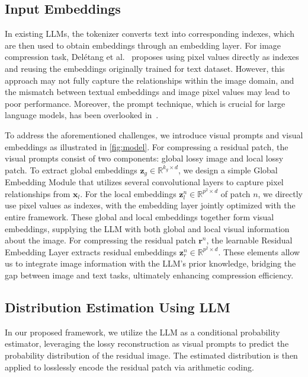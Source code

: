 \subsection{Input Embeddings} 


In existing LLMs, the tokenizer converts text into corresponding indexes, which are then used to obtain embeddings through an embedding layer. For image compression task, Del{\'e}tang et al.~\cite{deletang2023language} proposes using pixel values directly as indexes and reusing the embeddings originally trained for text dataset. However, this approach may not fully capture the relationships within the image domain, and the mismatch between textual embeddings and image pixel values may lead to poor performance. 
Moreover, the prompt technique, which is crucial for large language models, has been overlooked in~\cite{deletang2023language}.

To address the aforementioned challenges, we introduce visual prompts and visual embeddings as illustrated in \cref{fig:model}. For compressing a residual patch, the visual prompts consist of two components: global lossy image and local lossy patch. To extract global embeddings $\mathbf{z}_{g}\in\mathbb{R}^{k_{g}\times d}$, we design a simple Global Embedding Module that utilizes several convolutional layers to capture pixel relationships from $\mathbf{x}_l$. For the local embeddings $\mathbf{z}_l^n \in \mathbb{R}^{p^2 \times d}$ of patch $n$, we directly use pixel values as indexes, with the embedding layer jointly optimized with the entire framework. These global and local embeddings together form visual embeddings, supplying the LLM with both global and local visual information about the image. For compressing the residual patch $\mathbf{r}^n$, the learnable Residual Embedding Layer extracts residual embeddings $\mathbf{z}^n_r\in\mathbb{R}^{p^2\times d}$. These elements allow us to integrate image information with the LLM's prior knowledge, bridging the gap between image and text tasks, ultimately enhancing compression efficiency.

\subsection{Distribution Estimation Using LLM}

In our proposed framework, we utilize the LLM as a conditional probability estimator, leveraging the lossy reconstruction as visual prompts to predict the probability distribution of the residual image. The estimated distribution is then applied to losslessly encode the residual patch via arithmetic coding. 

